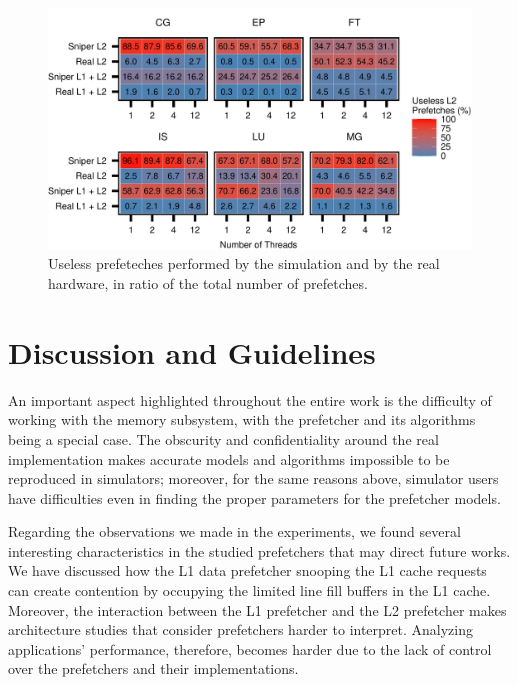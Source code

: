 \documentclass[AMA,final,STIX1COL]{WileyNJD-v2}
\begin{document}
\begin{figure}
    \centering
    \includegraphics[width=\linewidth]{figures/fig10.pdf}
    \caption{Useless prefeteches performed by the simulation and by the real hardware, in ratio of the total number of prefetches.}
    \label{fig:sniper_useless_pf_ratio}
\end{figure}





\section{Discussion and Guidelines}\label{sec:insights}

An important aspect highlighted throughout the entire work is the difficulty of working with the memory subsystem, with the prefetcher and its algorithms being a special case.
The obscurity and confidentiality around the real implementation makes accurate models and algorithms impossible to be reproduced in simulators; moreover, for the same reasons above, simulator users have difficulties even in finding the proper parameters for the prefetcher models.


Regarding the observations we made in the experiments, we found several interesting characteristics in the studied prefetchers that may direct future works.
We have discussed how the L1 data prefetcher snooping the L1 cache requests can create contention by occupying the limited line fill buffers in the L1 cache.
Moreover, the interaction between the L1 prefetcher and the L2 prefetcher makes architecture studies that consider prefetchers harder to interpret.
Analyzing applications' performance, therefore, becomes harder due to the lack of control over the prefetchers and their implementations.
\end{document}
